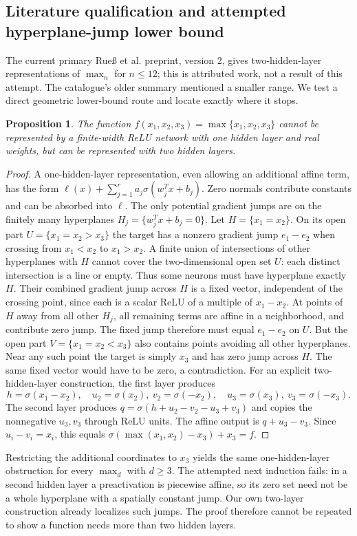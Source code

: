\documentclass[11pt]{article}
\newtheorem{proposition}{Proposition}
\begin{document}
\subsection{Literature qualification and attempted hyperplane-jump lower bound}
The current primary Rueß et al. preprint, version 2, gives two-hidden-layer representations of $\max_n$ for $n\le12$; this is attributed work, not a result of this attempt. The catalogue's older summary mentioned a smaller range. We test a direct geometric lower-bound route and locate exactly where it stops.
\begin{proposition}
The function $f(x_1,x_2,x_3)=\max\{x_1,x_2,x_3\}$ cannot be represented by a finite-width ReLU network with one hidden layer and real weights, but can be represented with two hidden layers.
\end{proposition}
\begin{proof}
A one-hidden-layer representation, even allowing an additional affine term, has the form
$\ell(x)+\sum_{j=1}^r a_j\sigma(w_j^Tx+b_j)$.
Zero normals contribute constants and can be absorbed into $\ell$. The only potential gradient jumps are on the finitely many hyperplanes $H_j=\{w_j^Tx+b_j=0\}$.
Let $H=\{x_1=x_2\}$. On its open part $U=\{x_1=x_2>x_3\}$ the target has a nonzero gradient jump $e_1-e_2$ when crossing from $x_1<x_2$ to $x_1>x_2$. A finite union of intersections of other hyperplanes with $H$ cannot cover the two-dimensional open set $U$: each distinct intersection is a line or empty. Thus some neurons must have hyperplane exactly $H$. Their combined gradient jump across $H$ is a fixed vector, independent of the crossing point, since each is a scalar ReLU of a multiple of $x_1-x_2$. At points of $H$ away from all other $H_j$, all remaining terms are affine in a neighborhood, and contribute zero jump. The fixed jump therefore must equal $e_1-e_2$ on $U$.
But the open part $V=\{x_1=x_2<x_3\}$ also contains points avoiding all other hyperplanes. Near any such point the target is simply $x_3$ and has zero jump across $H$. The same fixed vector would have to be zero, a contradiction.
For an explicit two-hidden-layer construction, the first layer produces
\[
 h=\sigma(x_1-x_2),\quad u_2=\sigma(x_2),\ v_2=\sigma(-x_2),\quad
 u_3=\sigma(x_3),\ v_3=\sigma(-x_3).
\]
The second layer produces $q=\sigma(h+u_2-v_2-u_3+v_3)$ and copies the nonnegative $u_3,v_3$ through ReLU units. The affine output is $q+u_3-v_3$. Since $u_i-v_i=x_i$, this equals $\sigma(\max(x_1,x_2)-x_3)+x_3=f$.
\end{proof}
Restricting the additional coordinates to $x_3$ yields the same one-hidden-layer obstruction for every $\max_d$ with $d\ge3$. The attempted next induction fails: in a second hidden layer a preactivation is piecewise affine, so its zero set need not be a whole hyperplane with a spatially constant jump. Our own two-layer construction already localizes such jumps. The proof therefore cannot be repeated to show a function needs more than two hidden layers.
\end{document}
